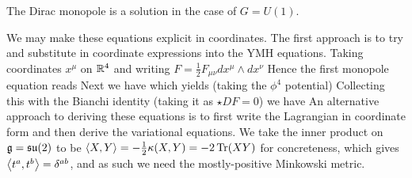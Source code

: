 \documentclass{article}
\begin{document}
\begin{remark}
	The Dirac monopole is a solution in the case of $G=U(1)$.
\end{remark}
We may make these equations explicit in coordinates. The first approach is to try and substitute in coordinate expressions into the YMH equations. Taking coordinates $x^\mu$ on $\mathbb{R}^4$ and writing $F = \frac{1}{2}F_{\mu\nu} dx^\mu \wedge dx^\nu$
Hence the first monopole equation reads 
Next we have 
which yields (taking the $\phi^4$ potential)
Collecting this with the Bianchi identity (taking it as $\star DF=0$) we have 
An alternative approach to deriving these equations is to first write the Lagrangian in coordinate form and then derive the variational equations. We take the inner product on $\mathfrak{g} = \mathfrak{su}(2)$ to be $\left\langle X,Y \right\rangle = -\frac{1}{2}\kappa(X,Y) = -2\operatorname{Tr}(XY)$ for concreteness, which gives $\left\langle t^a,t^b \right\rangle = \delta^{ab}$, and as such we need the mostly-positive Minkowski metric. 
\end{document}
